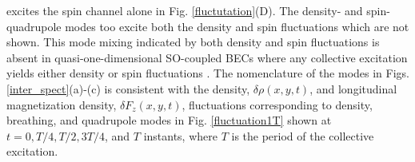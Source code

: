 \documentclass[pra,twocolumn,aps,superscriptaddress,showpacs,longbibliography]{revtex4-1}
\begin{document}
excites the spin channel alone in Fig. \ref{fluctutation}(D). The density- and spin-quadrupole modes 
too excite both the density and spin fluctuations which are not shown.
This mode mixing indicated by both density and spin fluctuations is absent in 
quasi-one-dimensional SO-coupled BECs where any collective excitation yields either density or spin fluctuations \cite{PhysRevA.106.013304}.
The nomenclature of the modes
in Figs. \ref{inter_spect}(a)-(c) is consistent with the density, $\delta\rho(x,y,t)$, and longitudinal magnetization
density, $\delta F_z(x,y,t)$, fluctuations corresponding to density, breathing, and quadrupole modes in 
Fig. \ref{fluctuation1T} shown at $t=0, T/4, T/2, 3T/4$, and $T$ instants, where $T$ is the period of the collective 
excitation.

\end{document}
